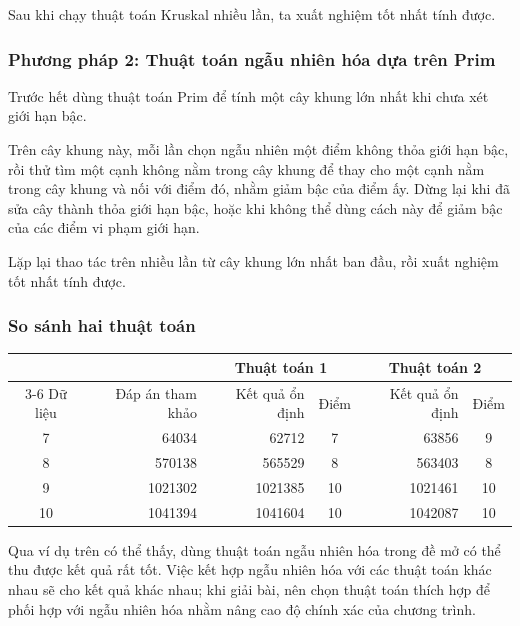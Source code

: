 \documentclass[11pt]{article}
\begin{document}
Sau khi chạy thuật toán Kruskal nhiều lần, ta xuất nghiệm tốt nhất tính được.

\subsubsection*{Phương pháp 2: Thuật toán ngẫu nhiên hóa dựa trên Prim}

Trước hết dùng thuật toán Prim để tính một cây khung lớn nhất khi chưa xét
giới hạn bậc.

Trên cây khung này, mỗi lần chọn ngẫu nhiên một điểm không thỏa giới hạn bậc,
rồi thử tìm một cạnh không nằm trong cây khung để thay cho một cạnh nằm trong
cây khung và nối với điểm đó, nhằm giảm bậc của điểm ấy. Dừng lại khi đã sửa
cây thành thỏa giới hạn bậc, hoặc khi không thể dùng cách này để giảm bậc của
các điểm vi phạm giới hạn.

Lặp lại thao tác trên nhiều lần từ cây khung lớn nhất ban đầu, rồi xuất nghiệm
tốt nhất tính được.

\subsubsection*{So sánh hai thuật toán}

\begin{center}
\begin{tabular}{c r r c r c}
\hline
 & & \multicolumn{2}{c}{Thuật toán 1} &
 \multicolumn{2}{c}{Thuật toán 2}\\
\cline{3-6}
Dữ liệu & Đáp án tham khảo & Kết quả ổn định\footnotemark & Điểm &
Kết quả ổn định & Điểm\\
\hline
7  & 64034   & 62712   & 7  & 63856   & 9\\
8  & 570138  & 565529  & 8  & 563403  & 8\\
9  & 1021302 & 1021385 & 10 & 1021461 & 10\\
10 & 1041394 & 1041604 & 10 & 1042087 & 10\\
\hline
\end{tabular}
\end{center}

Qua ví dụ trên có thể thấy, dùng thuật toán ngẫu nhiên hóa trong đề mở có thể
thu được kết quả rất tốt. Việc kết hợp ngẫu nhiên hóa với các thuật toán khác
nhau sẽ cho kết quả khác nhau; khi giải bài, nên chọn thuật toán thích hợp để
phối hợp với ngẫu nhiên hóa nhằm nâng cao độ chính xác của chương trình.
\end{document}
